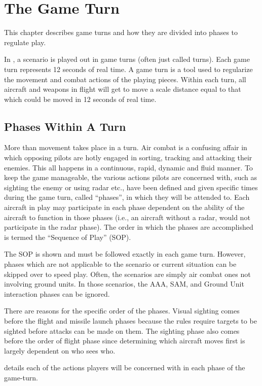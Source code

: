 \section{The Game Turn}

This chapter describes game turns and how they are divided into phases to regulate play.

In {\AirPow}, a scenario is played out in game turns (often just called turns). Each game turn represents 12 seconds of real time.  A game turn is a tool used to regularize the movement and combat actions of the playing pieces. Within each turn, all aircraft and weapons in flight will get to move a scale distance equal to that which could be moved in 12 seconds of real time.

\subsection{Phases Within A Turn}

More than movement takes place in a turn. Air combat is a confusing affair in which opposing pilots are hotly engaged in sorting, tracking and attacking their enemies. This all happens in a continuous, rapid, dynamic and fluid manner. To keep the game manageable, the various actions pilots are concerned with, such as sighting the enemy or using radar etc., have been defined and given specific times during the game turn, called “phases”, in which they will be attended to. Each aircraft in play may participate in each phase dependent on the ability of the aircraft to function in those phases (i.e., an aircraft without a radar, would not participate in the radar phase). The order in which the phases are accomplished is termed the “Sequence of Play” (SOP).

The {\AirPow} SOP is shown  and must be followed exactly in each game turn. However, phases which are not applicable to the scenario or current situation can be skipped over to speed play. Often, the scenarios are simply air combat ones not involving ground units. In those scenarios, the AAA, SAM, and Ground Unit interaction phases can be ignored.



There are reasons for the specific order of the phases. Visual sighting comes before the flight and missile launch phases because the rules require targets to be sighted before attacks can be made on them. The sighting phase also comes before the order of flight phase since determining which aircraft moves first is largely dependent on who sees who.



 details each of the actions players will be concerned with in each phase of the game-turn.